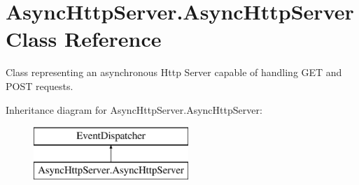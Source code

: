 \hypertarget{class_async_http_server_1_1_async_http_server}{\section{Async\-Http\-Server.\-Async\-Http\-Server Class Reference}
\label{class_async_http_server_1_1_async_http_server}
}


Class representing an asynchronous Http Server capable of handling G\-E\-T and P\-O\-S\-T requests.  


Inheritance diagram for Async\-Http\-Server.\-Async\-Http\-Server\-:\begin{figure}[H]
\begin{center}
\leavevmode
\includegraphics[height=2.000000cm]{class_async_http_server_1_1_async_http_server}
\end{center}
\end{figure}
